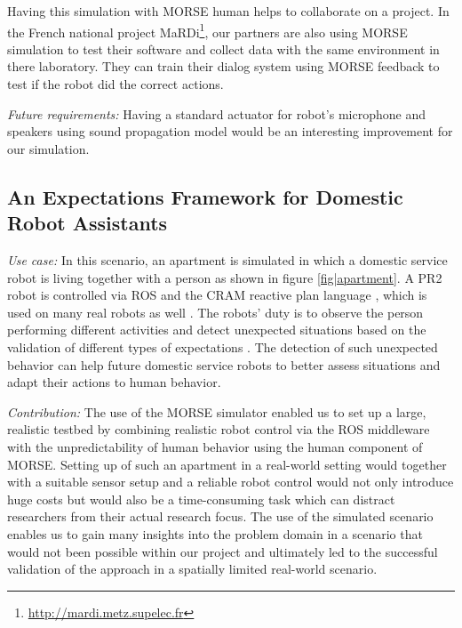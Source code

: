 \documentclass[conference]{IEEEtran}
\begin{document}
Having this simulation with MORSE human helps to collaborate on a project.
In the French national project MaRDi\footnote{\url{http://mardi.metz.supelec.fr}},
our partners are also using MORSE simulation to test their software and collect 
data with the same environment in there laboratory.
They can train their dialog system using MORSE feedback to test if the robot
did the correct actions.

\emph{Future requirements:}
Having a standard actuator for robot's microphone and speakers using sound
propagation model would be an interesting improvement for our simulation.

\subsection{An Expectations Framework for Domestic Robot Assistants}
\label{sc:expectations}

\emph{Use case:} In this scenario, an apartment is simulated in which a domestic 
service robot is living together with a person as shown in figure \ref{fig|apartment}. 
A PR2 robot is controlled via ROS and the CRAM reactive plan language \cite{beetz2010cram}, 
which is used on many real robots as well \cite{pancakes11humanoids}. The robots' 
duty is to observe the person performing different activities and detect unexpected 
situations based on the validation of different types of expectations \cite{Karg2013}. 
The detection of such unexpected behavior can help future domestic service robots 
to better assess situations and adapt their actions to human behavior. 

\emph{Contribution:} The use of the MORSE simulator enabled us to set up a large, 
realistic testbed by combining realistic robot control via the ROS middleware with the
unpredictability of human behavior using the human component of MORSE. Setting
up of such an apartment in a real-world setting would together with a suitable
sensor setup and a reliable robot control would not only introduce huge costs
but would also be a time-consuming task which can distract researchers from
their actual research focus. The use of the simulated scenario enables us to
gain many insights into the problem domain in a scenario that would not been
possible within our project and ultimately led to the successful validation of
the approach in a spatially limited real-world scenario.
\end{document}
